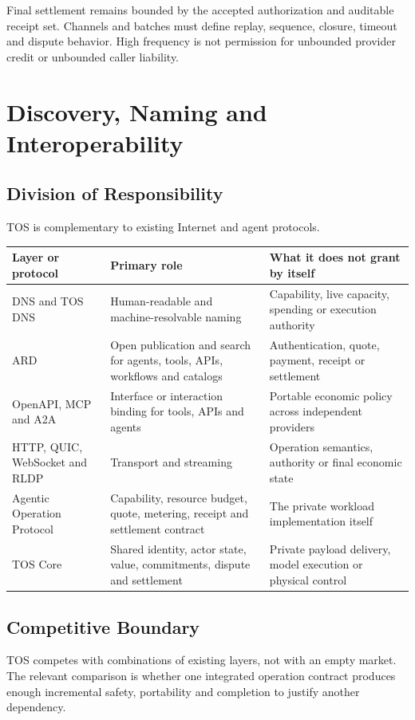 \documentclass[11pt,oneside]{article}
\begin{document}
Final settlement remains bounded by the accepted authorization and auditable receipt set.
Channels and batches must define replay, sequence, closure, timeout and dispute behavior.
High frequency is not permission for unbounded provider credit or unbounded caller liability.

\section{Discovery, Naming and Interoperability}

\subsection{Division of Responsibility}

TOS is complementary to existing Internet and agent protocols.

\begin{longtable}{L{0.20\textwidth}L{0.33\textwidth}L{0.36\textwidth}}
\toprule
Layer or protocol & Primary role & What it does not grant by itself \\
\midrule
\endhead
DNS and TOS DNS &
Human-readable and machine-resolvable naming &
Capability, live capacity, spending or execution authority \\
ARD &
Open publication and search for agents, tools, APIs, workflows and catalogs &
Authentication, quote, payment, receipt or settlement \\
OpenAPI, MCP and A2A &
Interface or interaction binding for tools, APIs and agents &
Portable economic policy across independent providers \\
HTTP, QUIC, WebSocket and RLDP &
Transport and streaming &
Operation semantics, authority or final economic state \\
Agentic Operation Protocol &
Capability, resource budget, quote, metering, receipt and settlement contract &
The private workload implementation itself \\
TOS Core &
Shared identity, actor state, value, commitments, dispute and settlement &
Private payload delivery, model execution or physical control \\
\bottomrule
\end{longtable}

\subsection{Competitive Boundary}

TOS competes with combinations of existing layers, not with an empty market. The relevant
comparison is whether one integrated operation contract produces enough incremental safety,
portability and completion to justify another dependency.
\end{document}
